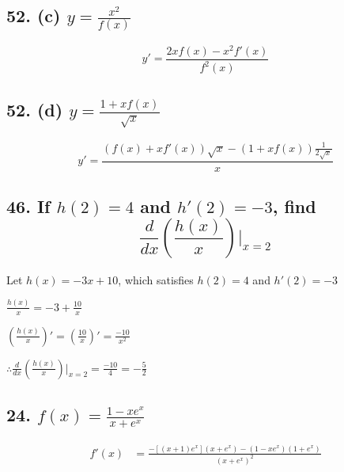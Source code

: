 \documentclass{article}
\begin{document}
    \subsection*{52. (c) $y = \frac{x^2}{f(x)}$}

    $$y' = \frac{2xf(x) - x^2f'(x)}{f^2(x)}$$

    \subsection*{52. (d) $y = \frac{1 + xf(x)}{\sqrt x}$}

    $$y' = \frac{(f(x) + xf'(x)) \sqrt x - (1 + xf(x)) \frac{1}{2\sqrt x}}{x}$$

    \subsection*{46. If $h(2) = 4$ and $h'(2) = -3$, find $$\frac{d}{dx}(\frac{h(x)}{x})|_{x = 2}$$}

    Let $h(x) = -3x + 10$, which satisfies $h(2) = 4$ and $h'(2) = -3$

    $\frac{h(x)}{x} = -3 + \frac{10}{x}$

    $(\frac{h(x)}{x})' = (\frac{10}{x})' = \frac{-10}{x^2}$

    $\therefore \frac{d}{dx}(\frac{h(x)}{x})|_{x = 2} = \frac{-10}{4} = -\frac 5 2$

    \subsection*{24. $f(x) = \frac{1 - xe^x}{x + e^x}$}

    $$
    \begin{aligned}
        f'(x) &= \frac{-[(x + 1)e^x](x + e^x) - (1 - xe^x)(1 + e^x)}{(x + e^x)^2} \\
    \end{aligned}
    $$
\end{document}
